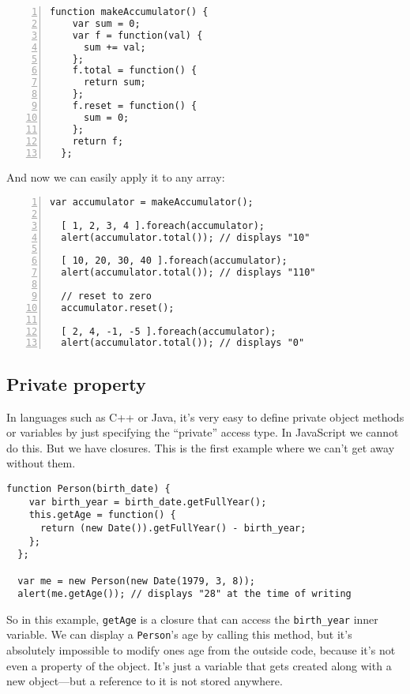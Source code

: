 \begin{lstlisting}[nolol,name=ForeachSample1,numbers=left]
  function makeAccumulator() {
    var sum = 0;
    var f = function(val) {
      sum += val;
    };
    f.total = function() {
      return sum;
    };
    f.reset = function() {
      sum = 0;
    };
    return f;
  };
\end{lstlisting}

And now we can easily apply it to any array:

\begin{lstlisting}[nolol,name=ForeachSample1,numbers=left]
  var accumulator = makeAccumulator();

  [ 1, 2, 3, 4 ].foreach(accumulator);
  alert(accumulator.total()); // displays "10"

  [ 10, 20, 30, 40 ].foreach(accumulator);
  alert(accumulator.total()); // displays "110"

  // reset to zero
  accumulator.reset();

  [ 2, 4, -1, -5 ].foreach(accumulator);
  alert(accumulator.total()); // displays "0"
\end{lstlisting}

\subsection{Private property}

In languages such as C++ or Java, it's very easy to define private object
methods or variables by just specifying the “private” access type.  In
JavaScript we cannot do this.  But we have closures.  This is the first example
where we can't get away without them.

\begin{lstlisting}[nolol]
  function Person(birth_date) {
    var birth_year = birth_date.getFullYear();
    this.getAge = function() {
      return (new Date()).getFullYear() - birth_year;
    };
  };

  var me = new Person(new Date(1979, 3, 8));
  alert(me.getAge()); // displays "28" at the time of writing
\end{lstlisting}

So in this example, \lstinline{getAge} is a closure that can access the
\lstinline{birth_year} inner variable.  We can display a \lstinline{Person}'s
age by calling this method, but it's absolutely impossible to modify ones age
from the outside code, because it's not even a property of the object.  It's
just a variable that gets created along with a new object—but a reference to it
is not stored anywhere.

